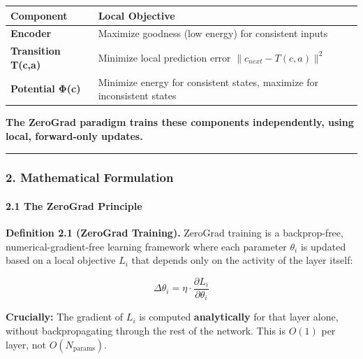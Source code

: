\documentclass[
  11pt,
  a4paper,
]{article}
\begin{document}
\begin{longtable}[]{@{}
  >{\raggedright\arraybackslash}p{}
  >{\raggedright\arraybackslash}p{}@{}}
\toprule\noalign{}
\begin{minipage}[b]{\linewidth}\raggedright
Component
\end{minipage} & \begin{minipage}[b]{\linewidth}\raggedright
Local Objective
\end{minipage} \\
\midrule\noalign{}
\endhead
\bottomrule\noalign{}
\endlastfoot
\textbf{Encoder} & Maximize goodness (low energy) for consistent
inputs \\
\textbf{Transition T(c,a)} & Minimize local prediction error
\(\|c_{next} - T(c,a)\|^2\) \\
\textbf{Potential Φ(c)} & Minimize energy for consistent states,
maximize for inconsistent states \\
\end{longtable}

\textbf{The ZeroGrad paradigm trains these components independently,
using local, forward-only updates.}

\begin{center}\rule{0.5\linewidth}{0.5pt}\end{center}

\subsubsection{2. Mathematical
Formulation}\label{mathematical-formulation-6}

\paragraph{2.1 The ZeroGrad Principle}\label{the-zerograd-principle}

\textbf{Definition 2.1 (ZeroGrad Training).} ZeroGrad training is a
backprop-free, numerical-gradient-free learning framework where each
parameter \(\theta_i\) is updated based on a local objective \(L_i\)
that depends only on the activity of the layer itself:

\[\Delta \theta_i = \eta \cdot \frac{\partial L_i}{\partial \theta_i}\]

\textbf{Crucially:} The gradient of \(L_i\) is computed
\textbf{analytically} for that layer alone, without backpropagating
through the rest of the network. This is \(O(1)\) per layer, not
\(O(N_{\text{params}})\).
\end{document}
